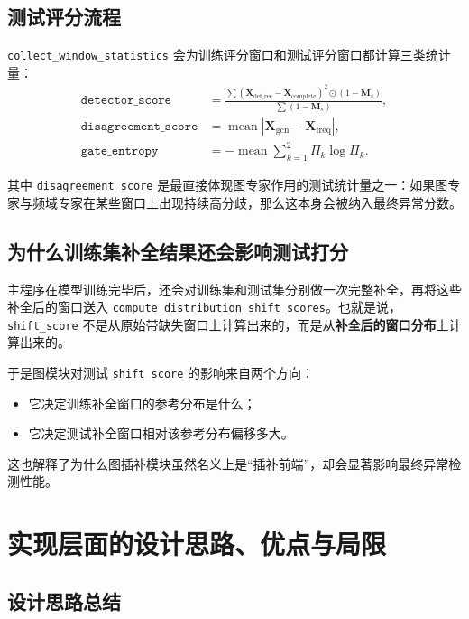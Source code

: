 \documentclass[UTF8]{ctexart}
\begin{document}
\subsection{测试评分流程}

\texttt{collect\_window\_statistics} 会为训练评分窗口和测试评分窗口都计算三类统计量：
\begin{align}
    \texttt{detector\_score}
    &= \frac{\sum (\bm{X}_{\text{det\_rec}}-\bm{X}_{\text{complete}})^2 \odot (1-\bm{M}_{s})}
    {\sum (1-\bm{M}_{s})}, \\
    \texttt{disagreement\_score}
    &= \operatorname{mean}\left|\bm{X}_{\text{gcn}}-\bm{X}_{\text{freq}}\right|, \\
    \texttt{gate\_entropy}
    &= -\operatorname{mean}\sum_{k=1}^{2}\Pi_{k}\log \Pi_{k}.
\end{align}

其中 \texttt{disagreement\_score} 是最直接体现图专家作用的测试统计量之一：如果图专家与频域专家在某些窗口上出现持续高分歧，那么这本身会被纳入最终异常分数。

\subsection{为什么训练集补全结果还会影响测试打分}

主程序在模型训练完毕后，还会对训练集和测试集分别做一次完整补全，再将这些补全后的窗口送入 \texttt{compute\_distribution\_shift\_scores}。也就是说，\texttt{shift\_score} 不是从原始带缺失窗口上计算出来的，而是从\textbf{补全后的窗口分布}上计算出来的。

于是图模块对测试 \texttt{shift\_score} 的影响来自两个方向：
\begin{itemize}
    \item 它决定训练补全窗口的参考分布是什么；
    \item 它决定测试补全窗口相对该参考分布偏移多大。
\end{itemize}

这也解释了为什么图插补模块虽然名义上是“插补前端”，却会显著影响最终异常检测性能。

\section{实现层面的设计思路、优点与局限}

\subsection{设计思路总结}
\end{document}
